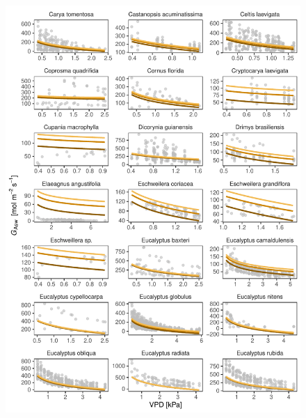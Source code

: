 \documentclass[11pt,twoside]{reedthesis}
\begin{document}
\begin{figure}[H]

{\centering \includegraphics[width=1\linewidth]{figure/appendixD/ggg2} 

}

\end{figure}
\end{document}
